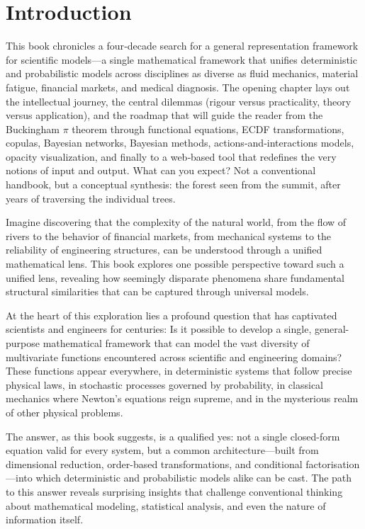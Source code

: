 \section{Introduction}
This book chronicles a four‑decade search for a general representation framework for scientific models—a single mathematical framework that unifies deterministic and probabilistic models across disciplines as diverse as fluid mechanics, material fatigue, financial markets, and medical diagnosis. The opening chapter lays out the intellectual journey, the central dilemmas (rigour versus practicality, theory versus application), and the roadmap that will guide the reader from the Buckingham \(\pi\) theorem through functional equations, ECDF transformations, copulas, Bayesian networks, Bayesian methods, actions‑and‑interactions models, opacity visualization, and finally to a web‑based tool that redefines the very notions of input and output. What can you expect? Not a conventional handbook, but a conceptual synthesis: the forest seen from the summit, after years of traversing the individual trees.

Imagine discovering that the complexity of the natural world, from the flow of rivers to the behavior of financial markets, from mechanical systems to the reliability of engineering structures, can be understood through a unified mathematical lens. This book explores one possible perspective toward such a unified lens, revealing how seemingly disparate phenomena share fundamental structural similarities that can be captured through universal models.

At the heart of this exploration lies a profound question that has captivated scientists and engineers for centuries: Is it possible to develop a single, general-purpose mathematical framework that can model the vast diversity of multivariate functions encountered across scientific and engineering domains? These functions appear everywhere, in deterministic systems that follow precise physical laws, in stochastic processes governed by probability, in classical mechanics where Newton's equations reign supreme, and in the mysterious realm of other physical problems.

The answer, as this book suggests, is a qualified yes: not a single closed-form equation valid for every system, but a common architecture—built from dimensional reduction, order-based transformations, and conditional factorisation—into which deterministic and probabilistic models alike can be cast. The path to this answer reveals surprising insights that challenge conventional thinking about mathematical modeling, statistical analysis, and even the nature of information itself.

